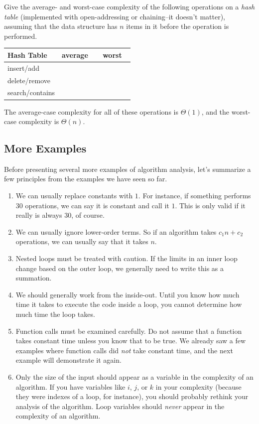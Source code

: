 \begin{exer}
Give the average- and worst-case complexity of the following operations
on a {\em hash table} (implemented with open-addressing or chaining--it doesn't matter),
assuming that the data structure has $n$ items in it before the operation is performed.

\noindent
{\LARGE
\begin{tabular}{|l|l|l|}
\hline
{\bf Hash Table}&average&\, \, worst\, \, \\
\hline
\hline
insert/add&&\\
\hline
delete/remove&&\\
\hline
search/contains&&\\
\hline
\end{tabular}
}
\begin{answer}
The average-case complexity for all of these operations is $\Theta(1)$, 
and the worst-case complexity is $\Theta(n)$.
\end{answer}
\end{exer}


\newpage
\subsection{More Examples}
Before presenting several more examples of algorithm analysis, let's
summarize a few principles from the examples we have seen so far.  
\begin{enumerate}
\item
We can usually replace constants with $1$.  For instance, if something performs 
$30$ operations, we can say it is constant and call it $1$.  This is only valid if 
it really is always $30$, of course.  
\item
We can usually ignore lower-order terms.
So if an algorithm takes $c_1n+c_2$ operations, we can usually say that it takes $n$.
\item
Nested loops must be treated with caution.  If the limits in an inner loop change based
on the outer loop, we generally need to write this as a summation.
\item
We should generally work from the inside-out.  Until you know how much time it takes
to execute the code inside a loop, you cannot determine how much time the loop takes.
\item
Function calls must be examined carefully.  Do not assume that a function
takes constant time unless you know that to be true. 
We already saw a few examples where function calls did {\em not}
take constant time, and the next example will demonstrate it again.
\item
Only the size of the input should appear as a variable in the complexity of an algorithm.
If you have variables like $i$, $j$, or $k$ in your complexity 
(because they were indexes of a loop, for instance), you should probably rethink
your analysis of the algorithm.  
Loop variables should {\em never} appear in the complexity of an algorithm.
\end{enumerate}

